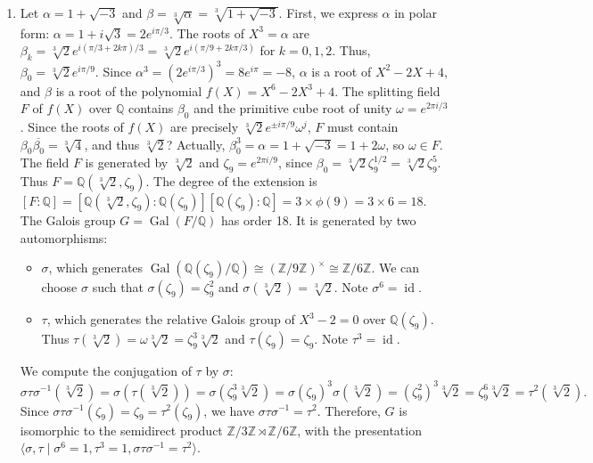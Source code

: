 \documentclass{article}
\begin{document}
\begin{enumerate}[label=\fbox{\arabic*}]
  \item %
        Let $\alpha = 1 + \sqrt{-3}$ and $\beta = \sqrt[3]{\alpha} = \sqrt[3]{1 + \sqrt{-3}}$. 
        First, we express $\alpha$ in polar form: $\alpha = 1 + i\sqrt{3} = 2 e^{i\pi/3}$. 
        The roots of $X^3 = \alpha$ are $\beta_k = \sqrt[3]{2} e^{i(\pi/3 + 2k\pi)/3} = \sqrt[3]{2} e^{i(\pi/9 + 2k\pi/3)}$ for $k = 0, 1, 2$. 
        Thus, $\beta_0 = \sqrt[3]{2} e^{i\pi/9}$. 
        Since $\alpha^3 = (2 e^{i\pi/3})^3 = 8 e^{i\pi} = -8$, $\alpha$ is a root of $X^2 - 2X + 4$, and $\beta$ is a root of the polynomial $f(X) = X^6 - 2X^3 + 4$.
        The splitting field $F$ of $f(X)$ over $\mathbb{Q}$ contains $\beta_0$ and the primitive cube root of unity $\omega = e^{2\pi i/3}$.
        Since the roots of $f(X)$ are precisely $\sqrt[3]{2} e^{\pm i\pi/9} \omega^j$, $F$ must contain $\beta_0 \overline{\beta_0} = \sqrt[3]{4}$, and thus $\sqrt[3]{2}$? Actually, $\beta_0^3 = \alpha = 1 + \sqrt{-3} = 1 + 2\omega$, so $\omega \in F$. 
        The field $F$ is generated by $\sqrt[3]{2}$ and $\zeta_9 = e^{2\pi i/9}$, since $\beta_0 = \sqrt[3]{2} \zeta_9^{1/2} = \sqrt[3]{2} \zeta_9^5$. Thus $F = \mathbb{Q}(\sqrt[3]{2}, \zeta_9)$.
        The degree of the extension is $[F:\mathbb{Q}] = [\mathbb{Q}(\sqrt[3]{2}, \zeta_9) : \mathbb{Q}(\zeta_9)] [\mathbb{Q}(\zeta_9) : \mathbb{Q}] = 3 \times \phi(9) = 3 \times 6 = 18$.
        The Galois group $G = \operatorname{Gal}(F/\mathbb{Q})$ has order 18. It is generated by two automorphisms:
        \begin{itemize}
          \item $\sigma$, which generates $\operatorname{Gal}(\mathbb{Q}(\zeta_9)/\mathbb{Q}) \cong (\mathbb{Z}/9\mathbb{Z})^\times \cong \mathbb{Z}/6\mathbb{Z}$. We can choose $\sigma$ such that $\sigma(\zeta_9) = \zeta_9^2$ and $\sigma(\sqrt[3]{2}) = \sqrt[3]{2}$. Note $\sigma^6 = \operatorname{id}$.
          \item $\tau$, which generates the relative Galois group of $X^3 - 2 = 0$ over $\mathbb{Q}(\zeta_9)$. Thus $\tau(\sqrt[3]{2}) = \omega \sqrt[3]{2} = \zeta_9^3 \sqrt[3]{2}$ and $\tau(\zeta_9) = \zeta_9$. Note $\tau^3 = \operatorname{id}$.
        \end{itemize}
        We compute the conjugation of $\tau$ by $\sigma$:
        \[
          \sigma \tau \sigma^{-1}(\sqrt[3]{2}) = \sigma(\tau(\sqrt[3]{2})) = \sigma(\zeta_9^3 \sqrt[3]{2}) = \sigma(\zeta_9)^3 \sigma(\sqrt[3]{2}) = (\zeta_9^2)^3 \sqrt[3]{2} = \zeta_9^6 \sqrt[3]{2} = \tau^2(\sqrt[3]{2}).
        \]
        Since $\sigma \tau \sigma^{-1}(\zeta_9) = \zeta_9 = \tau^2(\zeta_9)$, we have $\sigma \tau \sigma^{-1} = \tau^2$.
        Therefore, $G$ is isomorphic to the semidirect product $\mathbb{Z}/3\mathbb{Z} \rtimes \mathbb{Z}/6\mathbb{Z}$, with the presentation $\langle \sigma, \tau \mid \sigma^6 = 1, \tau^3 = 1, \sigma \tau \sigma^{-1} = \tau^2 \rangle$.


\end{enumerate}
\end{document}
